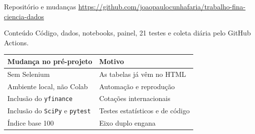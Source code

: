 \documentclass{beamer}
\begin{document}
\begin{frame}{Repositório e mudanças}
    \centering
    \scriptsize\url{https://github.com/joaopaulocunhafaria/trabalho-fina-ciencia-dados}

    \vspace{0.1cm}
    \raggedright
    \begin{block}{Conteúdo}
        Código, dados, notebooks, painel, 21 testes e coleta diária pelo GitHub Actions.
    \end{block}

    \small
    \begin{center}
        \begin{tabular}{@{}ll@{}}
            \toprule
            \textbf{Mudança no pré-projeto} & \textbf{Motivo} \\
            \midrule
            Sem Selenium & As tabelas já vêm no HTML \\
            Ambiente local, não Colab & Automação e reprodução \\
            Inclusão do \texttt{yfinance} & Cotações internacionais \\
            Inclusão do \texttt{SciPy} e \texttt{pytest} & Testes estatísticos e de código \\
            Índice base 100 & Eixo duplo engana \\
            \bottomrule
        \end{tabular}
    \end{center}
\end{frame}
\end{document}
